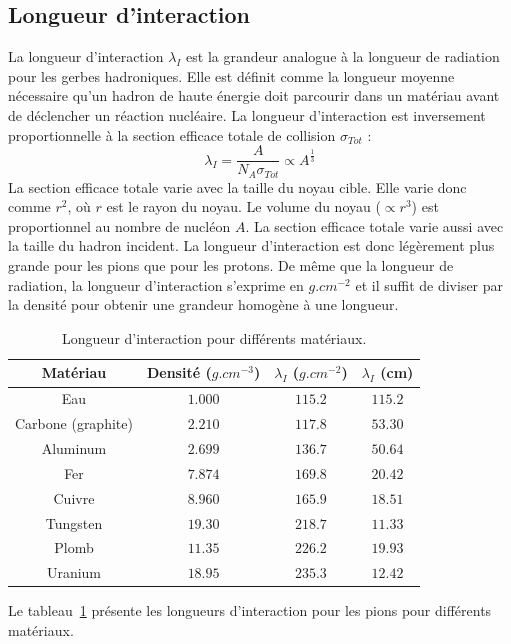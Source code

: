 \subsection{Longueur d'interaction}
La longueur d'interaction $\lambda_I$ est la grandeur analogue à la longueur de radiation pour les gerbes hadroniques. Elle est définit comme la longueur moyenne nécessaire qu'un hadron de haute énergie doit parcourir dans un matériau avant de déclencher un réaction nucléaire. La longueur d'interaction est inversement proportionnelle à la section efficace totale de collision $\sigma_{Tot}$ \cite{wigmans}:
\begin{equation}
  \lambda_I=\frac{A}{N_A\sigma_{Tot}} \propto A^\frac{1}{3}
\end{equation}
La section efficace totale varie avec la taille du noyau cible. Elle varie donc comme $r^2$, où $r$ est le rayon du noyau. Le volume du noyau ($\propto r^3$) est proportionnel au nombre de nucléon $A$. La section efficace totale varie aussi avec la taille du hadron incident. La longueur d'interaction est donc légèrement plus grande pour les pions que pour les protons. De même que la longueur de radiation, la longueur d'interaction s'exprime en $g.cm^{-2}$ et il suffit de diviser par la densité pour obtenir une grandeur homogène à une longueur. 
\begin{table}[!ht]
  \begin{center}
    \begin{tabular}{c|c|c|c}
      Matériau & Densité ($g.cm^{-3}$) & $\lambda_I$ ($g.cm^{-2}$) & $\lambda_I$ (cm)\\
      \hline
      Eau & $1.000$ & $115.2$ & $115.2$ \\
      Carbone (graphite) & $2.210$ & $117.8$ & $53.30$ \\
      Aluminum & $2.699$ & $136.7$ & $50.64$ \\
      Fer & $7.874$ & $169.8$ & $20.42$\\
      Cuivre & $8.960$ & $165.9$ & $18.51$\\
      Tungsten & $19.30$ & $218.7$ & $11.33$\\
      Plomb & $11.35$ & $226.2$ & $19.93$\\
      Uranium & $18.95$ & $235.3$ & $12.42$\\
    \end{tabular}
  \end{center}  
  \caption{Longueur d'interaction pour différents matériaux.}
  \label{tab.lI}
\end{table}
Le tableau~\ref{tab.lI} présente les longueurs d'interaction pour les pions pour différents matériaux.

